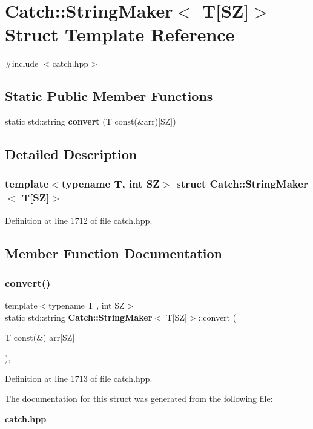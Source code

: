 \section{Catch\+::String\+Maker$<$ T[SZ]$>$ Struct Template Reference}
\label{struct_catch_1_1_string_maker_3_01_t[_s_z]_4}


{\ttfamily \#include $<$catch.\+hpp$>$}

\subsection*{Static Public Member Functions}
\begin{DoxyCompactItemize}
\item 
static std\+::string \textbf{ convert} (T const(\&arr)[SZ])
\end{DoxyCompactItemize}


\subsection{Detailed Description}
\subsubsection*{template$<$typename T, int SZ$>$\newline
struct Catch\+::\+String\+Maker$<$ T[\+S\+Z]$>$}



Definition at line 1712 of file catch.\+hpp.



\subsection{Member Function Documentation}
\mbox{\label{struct_catch_1_1_string_maker_3_01_t[_s_z]_4_a3698cea2c24d8649ec9ecb5fa679eeb7}} 
\subsubsection{convert()}
{\footnotesize\ttfamily template$<$typename T , int SZ$>$ \\
static std\+::string \textbf{ Catch\+::\+String\+Maker}$<$ T[SZ]$>$\+::convert (\begin{DoxyParamCaption}\item[{T const(\&)}]{arr[\+S\+Z] }\end{DoxyParamCaption})\hspace{0.3cm}{\ttfamily [inline]}, {\ttfamily [static]}}



Definition at line 1713 of file catch.\+hpp.



The documentation for this struct was generated from the following file\+:\begin{DoxyCompactItemize}
\item 
\textbf{ catch.\+hpp}\end{DoxyCompactItemize}
